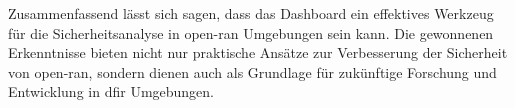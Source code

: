 Zusammenfassend lässt sich sagen, dass das Dashboard ein effektives Werkzeug für die Sicherheitsanalyse in \gls{open-ran} Umgebungen sein kann. Die gewonnenen Erkenntnisse bieten nicht nur praktische Ansätze zur Verbesserung der Sicherheit von \gls{open-ran}, sondern dienen auch als Grundlage für zukünftige Forschung und Entwicklung in \gls{dfir} Umgebungen.
